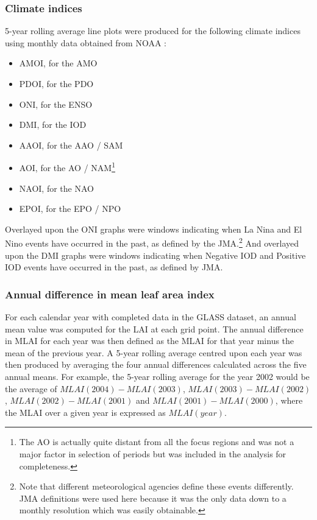 \subsubsection{Climate indices}
\label{ssec:indices}

5-year rolling average line plots were produced for the following climate indices using monthly data obtained from \ac{NOAA} \citep{ind_source}:
\begin{itemize}
	\item \ac{AMOI}, for the \ac{AMO}
	\item \ac{PDOI}, for the \ac{PDO}
	\item \ac{ONI}, for the \ac{ENSO}
	\item \ac{DMI}, for the \ac{IOD}
	\item \ac{AAOI}, for the \ac{AAO} / \ac{SAM}
	\item \ac{AOI}, for the \ac{AO} / \ac{NAM}\footnote{The \ac{AO} is actually quite distant from all the focus regions and was not a major factor in selection of periods but was included in the analysis for completeness.}
	\item \ac{NAOI}, for the \ac{NAO}
	\item \ac{EPOI}, for the \ac{EPO} / \ac{NPO}
\end{itemize}

Overlayed upon the \ac{ONI} graphs were windows indicating when La Nina and El Nino events have occurred in the past, as defined by the \ac{JMA}.\footnote{Note that different meteorological agencies define these events differently. \ac{JMA} definitions were used here because it was the only data down to a monthly resolution which was easily obtainable.} And overlayed upon the \ac{DMI} graphs were windows indicating when Negative \ac{IOD} and Positive \ac{IOD} events have occurred in the past, as defined by \ac{JMA}.

\subsubsection{Annual difference in mean leaf area index}
\label{ssec:mlai_diff}

For each calendar year with completed data in the \ac{GLASS} dataset, an annual mean value was computed for the \ac{LAI} at each grid point. The annual difference in \ac{MLAI} for each year was then defined as the \ac{MLAI} for that year minus the mean of the previous year. A 5-year rolling average centred upon each year was then produced by averaging the four annual differences calculated across the five annual means. For example, the 5-year rolling average for the year 2002 would be the average of $MLAI(2004)-MLAI(2003)$, $MLAI(2003)-MLAI(2002)$, $MLAI(2002)-MLAI(2001)$ and $MLAI(2001)-MLAI(2000)$, where the \ac{MLAI} over a given year is expressed as $MLAI(year)$.

